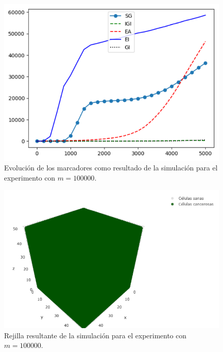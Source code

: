 \begin{figure}[h]
\centering
\includegraphics[scale=0.8]{figures/experiments/exp4/mutations}
\caption{Evolución de los marcadores como resultado de la simulación para el experimento con $m = 100000$.}
\end{figure}

\begin{figure}[h]
\centering
\includegraphics[scale=0.6]{figures/experiments/exp4/grid}
\caption{Rejilla resultante de la simulación para el experimento con $m = 100000$.}
\end{figure}

